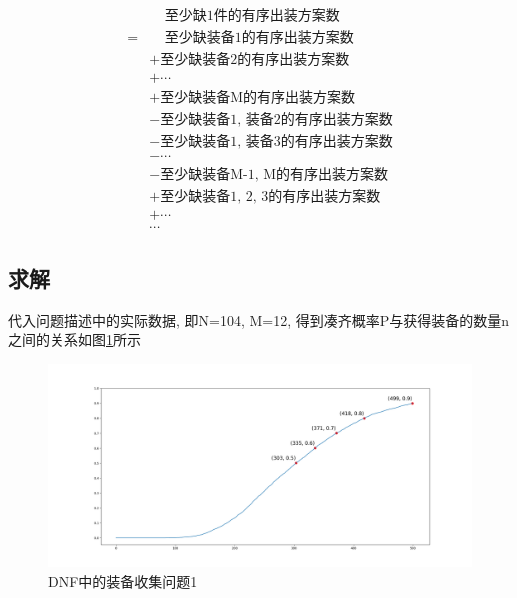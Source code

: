 \documentclass[10pt,journal,compsoc]{IEEEtran}
\begin{document}
    \begin{equation*}
      \begin{split}
        &~~~~~\text{至少缺1件的有序出装方案数} \\
        =&~~~~~\text{至少缺装备1的有序出装方案数} \\
        &+ \text{至少缺装备2的有序出装方案数} \\
        &+ \cdots \\
        &+ \text{至少缺装备M的有序出装方案数} \\
        &- \text{至少缺装备1, 装备2的有序出装方案数} \\
        &- \text{至少缺装备1, 装备3的有序出装方案数} \\
        &- \cdots \\
        &- \text{至少缺装备M-1, M的有序出装方案数} \\
        &+ \text{至少缺装备1, 2, 3的有序出装方案数} \\
        &+ \cdots \\
        &\cdots
      \end{split}
    \end{equation*}


  \subsection{求解}
    代入问题描述中的实际数据, 即N=104, M=12, 得到凑齐概率P与获得装备的数量n之间的关系如图\ref{fig:solution1}所示

    \begin{figure}[!ht]
    \centering
    \includegraphics[width=30pc]{img/solution1.png}
    \caption{DNF中的装备收集问题1}
    \label{fig:solution1}
    \end{figure}
\end{document}
